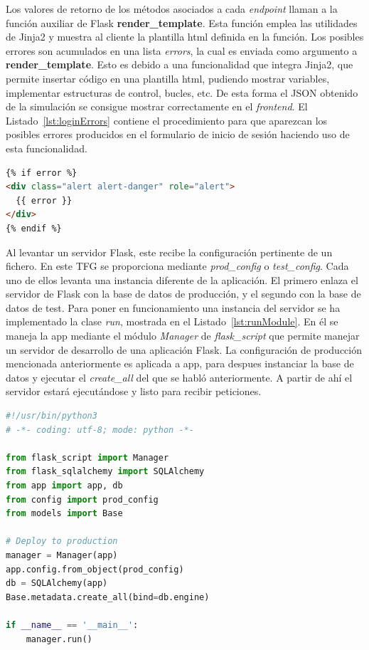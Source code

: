 Los valores de retorno de los métodos asociados a cada \textit{endpoint} llaman a la función auxiliar de Flask \textbf{render\_template}. Esta función emplea las utilidades de Jinja2 y muestra al cliente la plantilla html definida en la función.
Los posibles errores son acumulados en una lista \textit{errors}, la cual es enviada como argumento a \textbf{render\_template}. Esto es debido a una funcionalidad que integra Jinja2, que permite insertar código en una plantilla html, pudiendo mostrar variables, implementar estructuras de control, bucles, etc. De esta forma el \gls{JSON} obtenido de la simulación se consigue mostrar correctamente en el \textit{frontend}. El Listado~\ref{lst:loginErrors} contiene el procedimiento para que aparezcan los posibles errores producidos en el formulario de inicio de sesión haciendo uso de esta funcionalidad.
\begin{lstlisting}[language=Html,float=ht,caption={Mostrar los errores en el formulario de inicio de sesión},label={lst:loginErrors}]
{% if error %}
<div class="alert alert-danger" role="alert">
  {{ error }}
</div>
{% endif %}
\end{lstlisting}

Al levantar un servidor Flask, este recibe la configuración pertinente de un fichero. En este \gls{TFG} se proporciona mediante \textit{prod\_config} o \textit{test\_config}. Cada uno de ellos levanta una instancia diferente de la aplicación. El primero enlaza el servidor de Flask con la base de datos de producción, y el segundo con la base de datos de test. Para poner en funcionamiento una instancia del servidor se ha implementado la clase \textit{run}, mostrada en el Listado~\ref{lst:runModule}. En él se maneja la app mediante el módulo \textit{Manager} de \textit{flask\_script} que permite manejar un servidor de desarrollo de una aplicación Flask. La configuración de producción mencionada anteriormente es aplicada a app, para despues instanciar la base de datos y ejecutar el \textit{create\_all} del que se habló anteriormente. A partir de ahí el servidor estará ejecutándose y listo para recibir peticiones.

\begin{lstlisting}[language=Python,float=ht,numbers=none,caption={Módulo \textit{run} para arrancar el servidor},label={lst:runModule}]
#!/usr/bin/python3
# -*- coding: utf-8; mode: python -*-

from flask_script import Manager
from flask_sqlalchemy import SQLAlchemy
from app import app, db
from config import prod_config
from models import Base

# Deploy to production
manager = Manager(app)
app.config.from_object(prod_config)
db = SQLAlchemy(app)
Base.metadata.create_all(bind=db.engine)

if __name__ == '__main__':
    manager.run()
\end{lstlisting}

